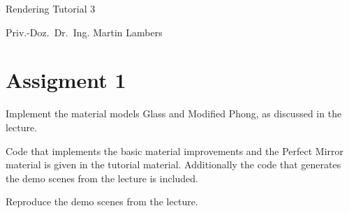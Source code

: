 \documentclass[a4paper,11pt]{article}
\newcommand{\authortitle}{Priv.-Doz.~Dr.~Ing.}
\newcommand{\authorname}{Martin Lambers}
\newcommand{\course}{Rendering}
\newcommand{\tutorial}{Tutorial 3}
\begin{document}
\thispagestyle{empty}

\LARGE

\centerline{\course{} \tutorial}

\vspace{1ex}

\normalsize

\centerline{\authortitle{} \authorname}


\section*{Assigment 1}

Implement the material models Glass and Modified Phong, as discussed in the
lecture.

Code that implements the basic material improvements and the Perfect Mirror
material is given in the tutorial material. Additionally the code that generates
the demo scenes from the lecture is included.

Reproduce the demo scenes from the lecture.
\end{document}
